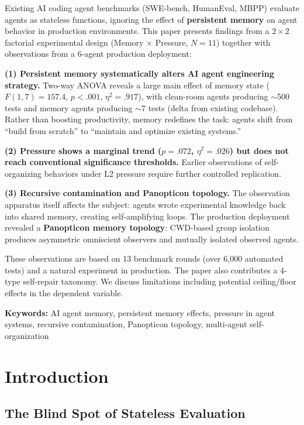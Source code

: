 \documentclass[11pt, a4paper]{article}
\begin{document}
Existing AI coding agent benchmarks (SWE-bench, HumanEval, MBPP) evaluate agents as stateless functions, ignoring the effect of \textbf{persistent memory} on agent behavior in production environments. This paper presents findings from a $2 \times 2$ factorial experimental design (Memory $\times$ Pressure, $N=11$) together with observations from a 6-agent production deployment:

\textbf{(1) Persistent memory systematically alters AI agent engineering strategy.} Two-way ANOVA reveals a large main effect of memory state ($F(1,7)=157.4$, $p<.001$, $\eta^2=.917$), with clean-room agents producing $\sim$500 tests and memory agents producing $\sim$7 tests (delta from existing codebase). Rather than boosting productivity, memory redefines the task: agents shift from ``build from scratch'' to ``maintain and optimize existing systems.''

\textbf{(2) Pressure shows a marginal trend ($p=.072$, $\eta^2=.026$) but does not reach conventional significance thresholds.} Earlier observations of self-organizing behaviors under L2 pressure require further controlled replication.

\textbf{(3) Recursive contamination and Panopticon topology.} The observation apparatus itself affects the subject: agents wrote experimental knowledge back into shared memory, creating self-amplifying loops. The production deployment revealed a \textbf{Panopticon memory topology}: CWD-based group isolation produces asymmetric omniscient observers and mutually isolated observed agents.

These observations are based on 13 benchmark rounds (over 6,000 automated tests) and a natural experiment in production. The paper also contributes a 4-type self-repair taxonomy. We discuss limitations including potential ceiling/floor effects in the dependent variable.

\textbf{Keywords:} AI agent memory, persistent memory effects, pressure in agent systems, recursive contamination, Panopticon topology, multi-agent self-organization

\clearpage
\tableofcontents
\clearpage

\section{Introduction}

\subsection{The Blind Spot of Stateless Evaluation}
\end{document}
